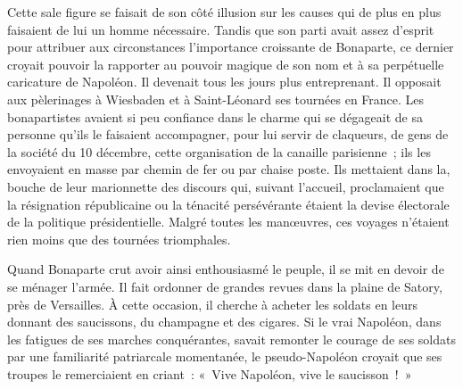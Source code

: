 \documentclass[twoside]{book} %
\begin{document}
Cette sale figure se faisait de son côté illusion sur les causes qui de plus en plus faisaient de lui un homme nécessaire. Tandis que son parti avait assez d’esprit pour attribuer aux circonstances l’importance croissante de Bonaparte, ce dernier croyait pouvoir la rapporter au pouvoir magique de son nom et à sa perpétuelle caricature de Napoléon. Il devenait tous les jours plus entreprenant. Il opposait aux pèlerinages à Wiesbaden et à Saint-Léonard ses tournées en France. Les bonapartistes avaient si peu confiance dans le charme qui se dégageait de sa personne qu’ils le faisaient accompagner, pour lui servir de claqueurs, de gens de la société du 10 décembre, cette organisation de la canaille parisienne ; ils les envoyaient en masse par chemin de fer ou par chaise poste. Ils mettaient dans la, bouche de leur marionnette des discours qui, suivant l’accueil, proclamaient que la résignation républicaine ou la ténacité persévérante étaient la devise électorale de la politique présidentielle. Malgré toutes les manœuvres, ces voyages n’étaient rien moins que des tournées triomphales.\par
Quand Bonaparte crut avoir ainsi enthousiasmé le peuple, il se mit en devoir de se ménager l’armée. Il fait ordonner de grandes revues dans la plaine de Satory, près de Versailles. À cette occasion, il cherche à acheter les soldats en leurs donnant des saucissons, du champagne et des cigares. Si le vrai Napoléon, dans les fatigues de ses marches conquérantes, savait remonter le courage de ses soldats par une familiarité patriarcale momentanée, le pseudo-Napoléon croyait que ses troupes le remerciaient en criant : « Vive Napoléon, vive le saucisson ! »\par
\end{document}
